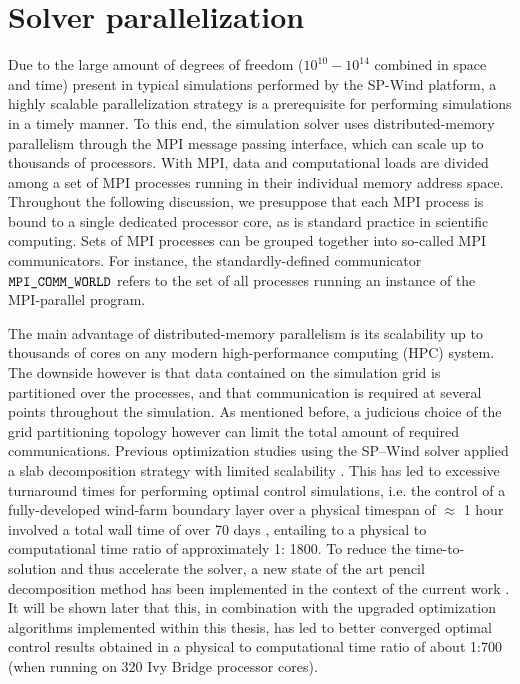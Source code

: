\section{Solver parallelization}\label{sec:meth_par}
Due to the large amount of degrees of freedom ($10^{10} - 10^{14}$ combined in space and time) present in typical simulations performed by the SP-Wind platform, a highly scalable parallelization strategy is a prerequisite for performing simulations in a timely manner. To this end, the simulation solver uses distributed-memory parallelism through the MPI message passing interface, which can scale up to thousands of processors. With MPI, data and computational loads are divided among a set of MPI processes running in their individual memory address space. Throughout the following discussion, we presuppose that each MPI process is bound to a single dedicated processor core, as is standard practice in scientific computing. Sets of MPI processes can be grouped together into so-called MPI communicators. For instance, the standardly-defined communicator $\verb|MPI_COMM_WORLD|$ refers to the set of all processes running an instance of the MPI-parallel program.

The main advantage of distributed-memory parallelism is its scalability up to thousands of cores on any modern high-performance computing (HPC) system. The downside however is
that data contained on the simulation grid is partitioned over the processes, and that communication is required at several points throughout the
simulation. As mentioned before, a judicious choice of the grid partitioning topology however can limit the total amount of required communications.
Previous optimization studies using the SP--Wind solver applied a slab decomposition strategy with limited scalability \citep{delport2009constrained,
goit2015optimal}. This has led to excessive turnaround times for performing optimal control simulations, i.e. the control of a fully-developed
wind-farm boundary layer over a physical timespan of $\approx$ 1 hour involved a total wall time of over 70 days \citep{goit2015optimal}, entailing to
a physical to computational time ratio of approximately 1: 1800. To reduce the time-to-solution and thus accelerate the solver, a new state of the art
pencil decomposition method has been implemented in the context of the current work \citep{li20102decomp}. It will be shown later that this, in
combination with the upgraded optimization algorithms implemented within this thesis, has led to better converged optimal control results obtained in
a physical to computational time ratio of about 1:700 (when running on 320 Ivy Bridge processor cores).

